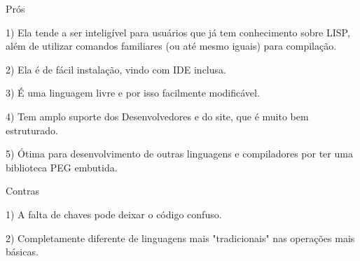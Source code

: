 \documentclass{beamer}
\begin{document}
\begin{frame}{Prós}

1) Ela tende a ser inteligível para usuários que já tem conhecimento sobre LISP, além de utilizar comandos familiares (ou até mesmo iguais) para compilação.

2) Ela é de fácil instalação, vindo com IDE inclusa.

3) É uma linguagem livre e por isso facilmente modificável.

4) Tem amplo suporte dos Desenvolvedores e do site, que é muito bem estruturado.

5) Ótima para desenvolvimento de outras linguagens e compiladores por ter uma biblioteca PEG embutida.


\end{frame}
\begin{frame}{Contras}

1) A falta de chaves pode deixar o código confuso.

2) Completamente diferente de linguagens mais "tradicionais" nas operações mais básicas.


\end{frame}
\end{document}
